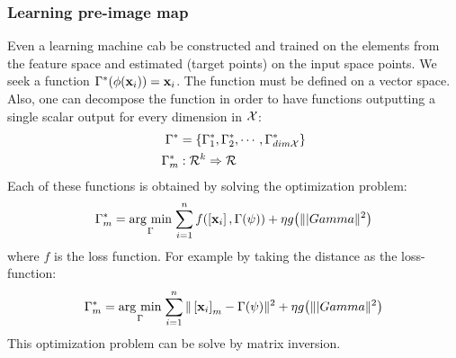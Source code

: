 \subsubsection{Learning pre-image map}
Even a learning machine cab be constructed and trained on the elements from the feature space and estimated (target points) on the input space points. We seek a function $\Gamma^*\br{\phi(\x_i)} = \x_i$. The function must be defined on a vector space. Also, one can decompose the function in order to have functions outputting a single scalar output for every dimension in $\CMcal{X}$: 
\begin{equation}
\begin{aligned}
\Gamma^* &= \{\Gamma^*_1, \Gamma^*_2, \cdots, \Gamma^*_{dim{\CMcal{X}}}\}\\
\Gamma^*_m&: \CMcal{R}^k \Rightarrow \CMcal{R}
\end{aligned}
\end{equation}
Each of these functions is obtained by solving the optimization problem:
\begin{equation}
 \Gamma^*_m = \argmin{\Gamma}{\sum_{i=1}^n f\br{\left[\x_i\right], \Gamma(\psi)}+\eta g\br{\||Gamma\|^2}}
\end{equation}
where $f$ is the loss function. For example by taking the distance as the loss-function:
\begin{equation}
 \Gamma^*_m = \argmin{\Gamma}{\sum_{i=1}^n \|\left[\x_i\right]_m - \Gamma\br{\psi}\|^2+\eta g\br{\||Gamma\|^2}}
\end{equation}
This optimization problem can be solve by matrix inversion.

